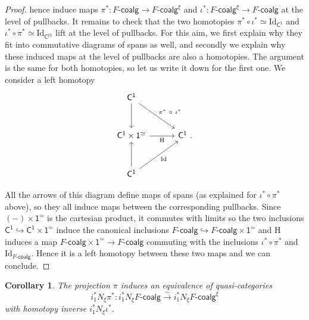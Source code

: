 \documentclass[a4paper,12pt]{amsart}
\theoremstyle{plain}
\newtheorem{corollary}[theorem]{Corollary}%
\theoremstyle{definition}
\theoremstyle{remark}
\begin{document}
\begin{proof}
hence induce maps $\pi^*:F\text{-}\mathsf{coalg}\longrightarrow F\text{-}\mathsf{coalg}^{\xi}$ and $\iota^*:F\text{-}\mathsf{coalg}^{\xi}\longrightarrow F\text{-}\mathsf{coalg}$ at the level of pullbacks. It remains to check that the two homotopies $\pi^*\circ\iota^*\simeq \mathrm{Id}_{\mathsf{C}^{\mathsf{1}}}$ and $\iota^*\circ\pi^*\simeq \mathrm{Id}_{\mathsf{C}^{\xi\mathsf{1}}}$ lift at the level of pullbacks. For this aim, we first explain why they fit into commutative diagrams of spans as well, and secondly we explain why these induced maps at the level of pullbacks are also a homotopies. The argument is the same for both homotopies, so let us write it down for the first one. We consider a left homotopy
\[
\begin{tikzcd}[column sep=2.5pc,row sep=2.5pc]
\mathsf{C}^{\mathsf{1}} 
  \arrow[d] 
  \arrow[dr, "\pi^*~ \circ ~ \iota^*"] 
& \\
\mathsf{C}^{\mathsf{1}} \times \mathsf{1}^{\simeq} 
  \arrow[r, "\mathrm{H}"'] 
& \mathsf{C}^{\mathsf{1}}~.\\
\mathsf{C}^{\mathsf{1}} 
  \arrow[u] 
  \arrow[ur, "\mathrm{Id}"'] 
&
\end{tikzcd}
\]

All the arrows of this diagram define maps of spans (as explained for $\iota^*\circ\pi^*$ above), so they all induce maps between the corresponding pullbacks. Since $(-) \times\mathsf{1}^{\simeq}$ is the cartesian product, it commutes with limits so the two inclusions $\mathsf{C}^{\mathsf{1}}\hookrightarrow \mathsf{C}^{\mathsf{1}}\times \mathsf{1}^{\simeq}$ induce the canonical inclusions $F\text{-}\mathsf{coalg}\hookrightarrow F\text{-}\mathsf{coalg}\times\mathsf{1}^{\simeq}$ and $\mathrm{H}$ induces a map $F\text{-}\mathsf{coalg}\times\mathsf{1}^{\simeq}\longrightarrow F\text{-}\mathsf{coalg}$ commuting with the inclusions $\iota^*\circ\pi^*$ and $\mathrm{Id}_{F\text{-}\mathsf{coalg}}$. Hence it is a left homotopy between these two maps and we can conclude.
\end{proof}


\begin{corollary}\label{cor:piquasicateq}
The projection $\pi$ induces an equivalence of quasi-categories
\[
i_1^*N_{\xi}\pi^*:i_1^*N_{\xi}F\text{-}\mathsf{coalg}\stackrel{\sim}{\rightarrow}i_1^*N_{\xi}F\text{-}\mathsf{coalg}^{\xi}
\]
with homotopy inverse $i_1^*N_{\xi}\iota^*$.
\end{corollary}
\end{document}
